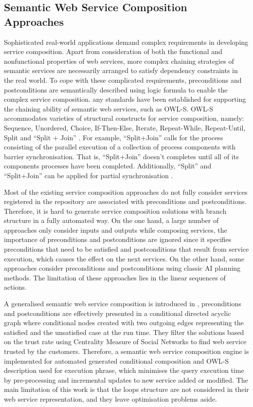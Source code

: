 \subsection{Semantic Web Service Composition Approaches}\label{Semantic}
Sophisticated real-world applications demand complex requirements in developing service composition. Apart from consideration of both the functional and nonfunctional properties of web services, more complex chaining strategies of semantic services are necessarily arranged to satisfy dependency constraints in the real world. To cope with these complicated requirements, preconditions and postconditions are semantically described using logic formula to enable the complex service composition. any standards have been established for supporting the chaining ability of semantic web services, such as OWL-S. OWL-S accommodates varieties of structural constructs for service composition, namely: Sequence, Unordered, Choice, If-Then-Else, Iterate, Repeat-While, Repeat-Until, Split and ``Split + Join'' \cite{wang2014automated}. For example, ``Split+Join'' calls for the process consisting of the parallel execution of a collection of process components with barrier synchronisation. That is, ``Split+Join'' doesn't completes until all of its components processes have been completed. Additionally, ``Split'' and ``Split+Join'' can be applied for partial synchronisation \cite{wang2014automated}.

Most of the existing service composition approaches do not fully consider services registered in the repository are associated with preconditions and postconditions.  Therefore, it is hard to generate service composition solutions with branch structure in a fully automated way. On the one hand,  a large number of approaches \cite{} only consider inputs and outputs while composing services, the importance of preconditions and postconditions are ignored since it specifies preconditions that need to be satisfied and postconditions that result from service execution,  which causes the effect on the next services. On the other hand, some approaches consider preconditions and postconditions using classic AI planning methods. The limitation of these approaches lies in the linear sequences of actions.


A generalised semantic web service composition is introduced in \cite{bansal2016generalized}, preconditions and postconditions are effectively presented in a conditional directed acyclic graph where conditional nodes created with two outgoing edges representing the satisfied and the unsatisfied case at the run time. They filter the solutions based on the trust rate using Centrality Measure of Social Networks to find web service trusted by the customers. Therefore, a semantic web service composition engine is implemented for automated generated conditional composition and OWL-S description used for execution phrase, which minimises the query execution time by pre-processing and incremental updates to new service added or modified. The main limitation of this work is that the loops structure are not considered in their web service representation, and they leave optimisation problems aside.

